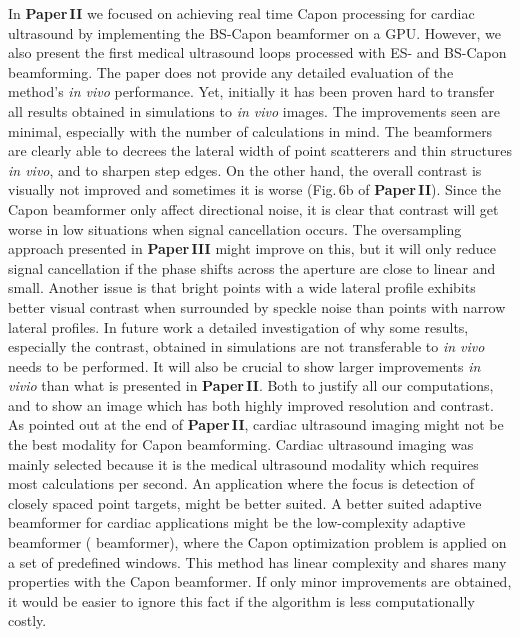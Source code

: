 In \textbf{Paper\,II} we focused on achieving real time Capon processing for cardiac ultrasound by implementing the BS-Capon beamformer on a GPU. However, we also present the first medical ultrasound loops processed with ES- and BS-Capon beamforming.  The paper does not provide any detailed evaluation of the method's \textit{in vivo} performance. Yet, initially it has been proven hard to transfer all results obtained in simulations to \textit{in vivo} images. The improvements seen are minimal, especially with the number of calculations in mind. The beamformers are clearly able to decrees the lateral width of point scatterers and thin structures \textit{in vivo}, and to sharpen step edges. On the other hand, the overall contrast is visually not improved and sometimes it is worse (Fig.\,6b of \textbf{Paper\,II}). Since the Capon beamformer only affect directional noise, it is clear that contrast will get worse in low  situations when signal cancellation occurs. The oversampling approach presented in \textbf{Paper\,III} might improve on this, but it will only reduce signal cancellation if the phase shifts across the aperture are close to linear and small. Another issue is that bright points with a wide lateral profile exhibits better visual contrast when surrounded by speckle noise than points with narrow lateral profiles. In future work a detailed investigation of why some results, especially the contrast, obtained in simulations are not transferable to \textit{in vivo} needs to be performed. It will also be crucial to show larger improvements \textit{in vivio} than what is presented in \textbf{Paper\,II}. Both to justify all our computations, and to show an image which has both highly improved resolution and contrast. As pointed out at the end of \textbf{Paper\,II}, cardiac ultrasound imaging might not be the best modality for Capon beamforming. Cardiac ultrasound imaging was mainly selected because it is the medical ultrasound modality which requires most calculations per second. An application where the focus is detection of closely spaced point targets, might be better suited. A better suited adaptive beamformer for cardiac applications might be the low-complexity adaptive beamformer ( beamformer), where the Capon optimization problem is applied on a set of predefined windows. This method has linear complexity and shares many properties with the Capon beamformer. If only minor improvements are obtained, it would be easier to ignore this fact if the algorithm is less computationally costly. %
